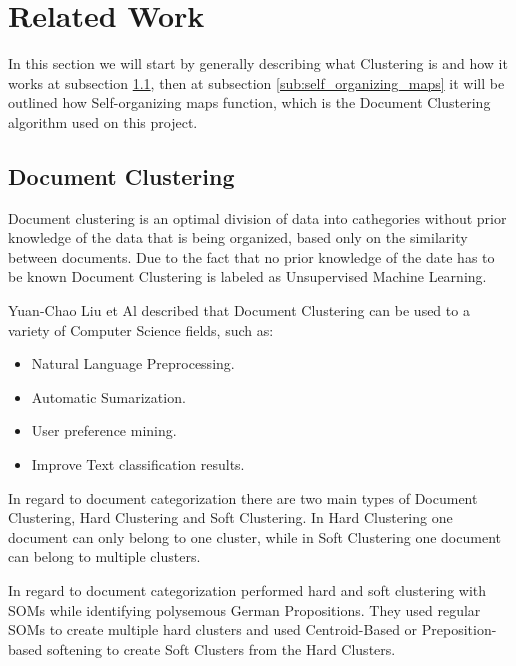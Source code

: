 \section{Related Work} %
\label{sec:related_work}
In this section we will start by generally describing what Clustering is and how it works at subsection \ref{sub:clustering}, then at subsection \ref{sub:self_organizing_maps} it will be outlined how Self-organizing \cite{Kohonen1990}maps function, which is the Document Clustering algorithm used on this project.


\subsection{Document Clustering} %
\label{sub:clustering}
Document clustering is an optimal division of data into cathegories without prior knowledge of the data that is being organized, based only on the similarity between documents. Due to the fact that no prior knowledge of the date has to be known Document Clustering is labeled as Unsupervised Machine Learning.

Yuan-Chao Liu et Al \cite{Liu2012b} described that Document Clustering can be used to a variety of Computer Science fields, such as:
\begin{itemize}
  \item Natural Language Preprocessing.
  \item Automatic Sumarization.
  \item User preference mining.
  \item Improve Text classification results.
\end{itemize}

In regard to document categorization there are two main types of Document Clustering, Hard Clustering and Soft Clustering. In Hard Clustering one document can only belong to one cluster, while in Soft Clustering one document can belong to multiple clusters. 

In regard to document categorization \citet{Springorum1998} performed hard and soft clustering with SOMs \citep{Kohonen1990} while identifying polysemous German Propositions. They used regular SOMs to create multiple hard clusters and used Centroid-Based or Preposition-based softening to create Soft Clusters from the Hard Clusters.

